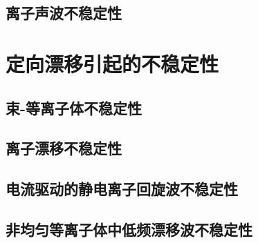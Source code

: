 \subsection{离子声波不稳定性}

\section{定向漂移引起的不稳定性}

\subsection{束-等离子体不稳定性}

\subsection{离子漂移不稳定性}

\subsection{电流驱动的静电离子回旋波不稳定性}

\subsection{非均匀等离子体中低频漂移波不稳定性}

